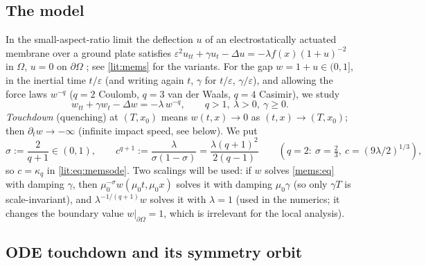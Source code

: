 \subsection{The model}
\label{mems:sec-model}
In the small-aspect-ratio limit the deflection $u$ of an electrostatically
actuated membrane over a ground plate satisfies $\varepsilon^2u_{tt}+\gamma
u_t-\Delta u=-\lambda f(x)(1+u)^{-2}$ in $\Omega$, $u=0$ on $\partial\Omega$
\cite{PeleskoBernstein2002,FloresEtAl2007,EspositoGhoussoubGuo2010}; see
\cref{lit:mems} for the variants. For the gap $w=1+u\in(0,1]$, in the inertial
time $t/\varepsilon$ (and writing again $t$, $\gamma$ for $t/\varepsilon$,
$\gamma/\varepsilon$), and allowing the force laws $w^{-q}$ ($q=2$ Coulomb,
$q=3$ van der Waals, $q=4$ Casimir), we study
\begin{equation}\label{mems:eq}
  w_{tt}+\gamma w_t-\Delta w=-\lambda\,w^{-q},\qquad q>1,\ \lambda>0,\ \gamma\ge0 .
\end{equation}
\emph{Touchdown} (quenching) at $(T,x_0)$ means $w(t,x)\to0$ as $(t,x)\to(T,x_0)$;
then $\partial_tw\to-\infty$ (infinite impact speed, see below). We put
\[
  \sigma:=\frac{2}{q+1}\in(0,1),\qquad
  c^{q+1}:=\frac{\lambda}{\sigma(1-\sigma)}=\frac{\lambda(q+1)^2}{2(q-1)}
  \qquad(q=2:\ \sigma=\tfrac23,\ c=(9\lambda/2)^{1/3}),
\]
so $c=\kappa_q$ in \eqref{lit:eq:memsode}. Two scalings will be used: if $w$
solves \eqref{mems:eq} with damping $\gamma$, then $\mu_0^{-\sigma}w(\mu_0
t,\mu_0 x)$ solves it with damping $\mu_0\gamma$ (so only $\gamma T$ is
scale-invariant), and $\lambda^{-1/(q+1)}w$ solves it with $\lambda=1$ (used in
the numerics; it changes the boundary value $w|_{\partial\Omega}=1$, which is
irrelevant for the local analysis).

\subsection{ODE touchdown and its symmetry orbit}
\label{mems:sec-ode}

